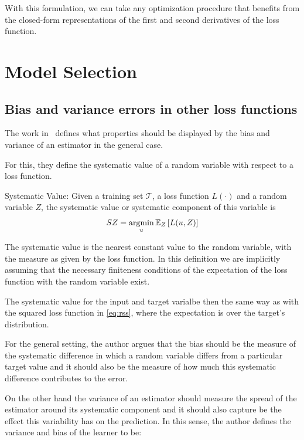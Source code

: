 With this formulation, we can take any optimization procedure that benefits from the closed-form representations of the first and second derivatives of the loss function.



\chapter{Model Selection}

\section{Bias and variance errors in other loss functions}\label{appx:sec:biasVarianceExtensionLoss}

The work in~\citep{james-biasVarianceGeneral} defines what properties should be displayed by the bias and variance of an estimator in the general case.

For this, they define the systematic value of a random variable with respect to a loss function.


\begin{definition}{Systematic Value:}
Given a training set $\mathcal{T}$, a loss function $L(\cdot)$ and a random variable $Z$, the systematic value or systematic component of this variable is
$$ SZ =  \operatorname*{argmin}_u \operatorname{\mathbb{E}}_{Z} \left[ L(u,Z) \right]$$
\end{definition}

The systematic value is the nearest constant value to the random variable, with the measure as given by the loss function.
In this definition we are implicitly assuming that the necessary finiteness conditions of the expectation of the loss function with the random variable exist.

The systematic value for the input and target varialbe then the same way as with the squared loss function in \cref{eq:rss}, where the expectation is over the target's distribution.

For the general setting, the author argues that the bias should be the measure of the systematic difference in which a random variable differs from a particular target value and it should also be the measure of how much this systematic difference contributes to the error.

On the other hand the variance of an estimator should measure the spread of the estimator around its systematic component and it should also capture be the effect this variability has on the prediction.
In this sense, the author defines the variance and bias of the learner to be:

